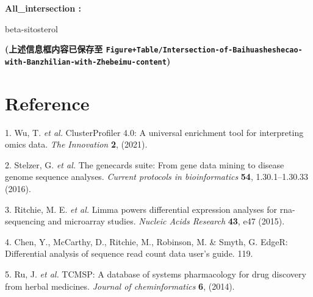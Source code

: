 \documentclass[
]{article}
\newenvironment{cslreferences}%
  {}%
  {\par}
\begin{document}
\begin{center}\vspace{1.5cm}\end{center}\begin{center}\begin{tcolorbox}[colback=gray!10, colframe=gray!50, width=0.9\linewidth, arc=1mm, boxrule=0.5pt]
\textbf{
All\_intersection
:}

\vspace{0.5em}

    beta-sitosterol

\vspace{2em}
\end{tcolorbox}
\end{center}

\textbf{(上述信息框内容已保存至 \texttt{Figure+Table/Intersection-of-Baihuasheshecao-with-Banzhilian-with-Zhebeimu-content})}

\hypertarget{bibliography}{%
\section*{Reference}\label{bibliography}}

\hypertarget{refs}{}
\begin{cslreferences}
\leavevmode\hypertarget{ref-ClusterprofilerWuTi2021}{}%
1. Wu, T. \emph{et al.} ClusterProfiler 4.0: A universal enrichment tool for interpreting omics data. \emph{The Innovation} \textbf{2}, (2021).

\leavevmode\hypertarget{ref-TheGenecardsSStelze2016}{}%
2. Stelzer, G. \emph{et al.} The genecards suite: From gene data mining to disease genome sequence analyses. \emph{Current protocols in bioinformatics} \textbf{54}, 1.30.1--1.30.33 (2016).

\leavevmode\hypertarget{ref-LimmaPowersDiRitchi2015}{}%
3. Ritchie, M. E. \emph{et al.} Limma powers differential expression analyses for rna-sequencing and microarray studies. \emph{Nucleic Acids Research} \textbf{43}, e47 (2015).

\leavevmode\hypertarget{ref-EdgerDifferenChen}{}%
4. Chen, Y., McCarthy, D., Ritchie, M., Robinson, M. \& Smyth, G. EdgeR: Differential analysis of sequence read count data user's guide. 119.

\leavevmode\hypertarget{ref-TcmspADatabaRuJi2014}{}%
5. Ru, J. \emph{et al.} TCMSP: A database of systems pharmacology for drug discovery from herbal medicines. \emph{Journal of cheminformatics} \textbf{6}, (2014).
\end{cslreferences}
\end{document}
